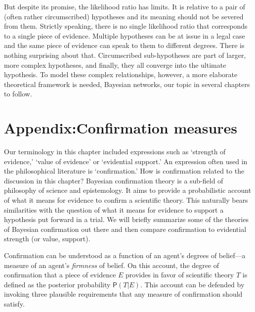 \documentclass[
  10pt,
  dvipsnames,enabledeprecatedfontcommands]{scrartcl}
\newcommand{\pr}[1]{\mathsf{P}(#1)}
\begin{document}
But despite its promise, the likelihood ratio has limits. It is relative
to a pair of (often rather circumscribed) hypotheses and its meaning
should not be severed from them. Strictly speaking, there is no single
likelihood ratio that corresponds to a single piece of evidence.
Multiple hypotheses can be at issue in a legal case and the same piece
of evidence can speak to them to different degrees. There is nothing
surprising about that. Circumscribed sub-hypotheses are part of larger,
more complex hypotheses, and finally, they all converge into the
ultimate hypothesis. To model these complex relationships, however, a
more elaborate theoretical framework is needed, Bayesian networks, our
topic in several chapters to follow.

\appendix


\hypertarget{appendixconfirmation-measures}{%
\section{\texorpdfstring{Appendix:Confirmation measures
\label{sec:confirmation}}{Appendix:Confirmation measures }}\label{appendixconfirmation-measures}}

Our terminology in this chapter included expressions such as `strength
of evidence,' `value of evidence' or `evidential support.' An expression
often used in the philosophical literature is `confirmation.' How is
confirmation related to the discussion in this chapter? Bayesian
confirmation theory is a sub-field of philosophy of science and
epistemology. It aims to provide a probabilistic account of what it
means for evidence to confirm a scientific theory. This naturally bears
similarities with the question of what it means for evidence to support
a hypothesis put forward in a trial. We will briefly summarize some of
the theories of Bayesian confirmation out there and then compare
confirmation to evidential strength (or value, support).

Confirmation can be understood as a function of an agent's degrees of
belief---a measure of an agent's \textit{firmness} of belief. On this
account, the degree of confirmation that a piece of evidence \(E\)
provides in favor of scientific theory \(T\) is defined as the posterior
probability \(\pr{T \vert E}\). This account can be defended by invoking
three plausible requirements that any measure of confirmation should
satisfy.
\end{document}
